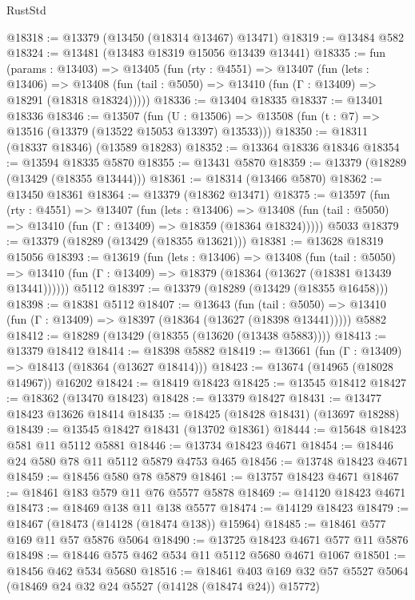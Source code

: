 \begin{lexlean}{RustStd}
\begin{coremodule}
@18318 := @13379 (@13450 (@18314 @13467) @13471)
@18319 := @13484 @582
@18324 := @13481 (@13483 @18319 @15056 @13439 @13441)
@18335 := fun (params : @13403) =>
  @13405
    (fun (rty : @4551) =>
    @13407
      (fun (lets : @13406) =>
      @13408 (fun (tail : @5050) => @13410 (fun (Γ : @13409) => @18291 (@18318 @18324)))))
@18336 := @13404 @18335
@18337 := @13401 @18336
@18346 := @13507
    (fun (U : @13506) => @13508 (fun (t : @7) => @13516 (@13379 (@13522 @15053 @13397) @13533)))
@18350 := @18311 (@18337 @18346) (@13589 @18283)
@18352 := @13364 @18336 @18346
@18354 := @13594 @18335 @5870
@18355 := @13431 @5870
@18359 := @13379 (@18289 (@13429 (@18355 @13444)))
@18361 := @18314 (@13466 @5870)
@18362 := @13450 @18361
@18364 := @13379 (@18362 @13471)
@18375 := @13597
    (fun (rty : @4551) =>
    @13407
      (fun (lets : @13406) =>
      @13408 (fun (tail : @5050) => @13410 (fun (Γ : @13409) => @18359 (@18364 @18324)))))
    @5033
@18379 := @13379 (@18289 (@13429 (@18355 @13621)))
@18381 := @13628 @18319 @15056
@18393 := @13619
    (fun (lets : @13406) =>
    @13408
      (fun (tail : @5050) =>
      @13410 (fun (Γ : @13409) => @18379 (@18364 (@13627 (@18381 @13439 @13441))))))
    @5112
@18397 := @13379 (@18289 (@13429 (@18355 @16458)))
@18398 := @18381 @5112
@18407 := @13643
    (fun (tail : @5050) => @13410 (fun (Γ : @13409) => @18397 (@18364 (@13627 (@18398 @13441)))))
    @5882
@18412 := @18289 (@13429 (@18355 (@13620 (@13438 @5883))))
@18413 := @13379 @18412
@18414 := @18398 @5882
@18419 := @13661 (fun (Γ : @13409) => @18413 (@18364 (@13627 @18414)))
@18423 := @13674 (@14965 (@18028 @14967)) @16202
@18424 := @18419 @18423
@18425 := @13545 @18412
@18427 := @18362 (@13470 @18423)
@18428 := @13379 @18427
@18431 := @13477 @18423 @13626 @18414
@18435 := @18425 (@18428 @18431) (@13697 @18288)
@18439 := @13545 @18427 @18431 (@13702 @18361)
@18444 := @15648 @18423 @581 @11 @5112 @5881
@18446 := @13734 @18423 @4671
@18454 := @18446 @24 @580 @78 @11 @5112 @5879 @4753 @465
@18456 := @13748 @18423 @4671
@18459 := @18456 @580 @78 @5879
@18461 := @13757 @18423 @4671
@18467 := @18461 @183 @579 @11 @76 @5577 @5878
@18469 := @14120 @18423 @4671
@18473 := @18469 @138 @11 @138 @5577
@18474 := @14129 @18423
@18479 := @18467 (@18473 (@14128 (@18474 @138)) @15964)
@18485 := @18461 @577 @169 @11 @57 @5876 @5064
@18490 := @13725 @18423 @4671 @577 @11 @5876
@18498 := @18446 @575 @462 @534 @11 @5112 @5680 @4671 @1067
@18501 := @18456 @462 @534 @5680
@18516 := @18461
    @403
    @169
    @32
    @57
    @5527
    @5064
    (@18469 @24 @32 @24 @5527 (@14128 (@18474 @24)) @15772)

\end{coremodule}
\end{lexlean}
